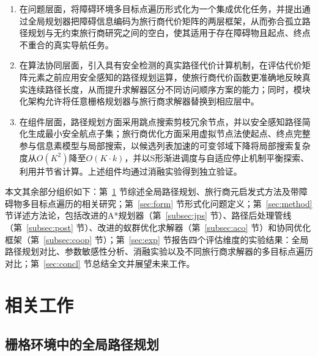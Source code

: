\documentclass[lettersize,journal]{IEEEtran}
\begin{document}
\begin{enumerate}

\item 在问题层面，将障碍环境多目标点遍历形式化为一个集成优化任务，并提出通过全局规划器把障碍信息编码为旅行商代价矩阵的两层框架，从而弥合孤立路径规划与无约束旅行商研究之间的空白，使其适用于存在障碍物且起点、终点不重合的真实导航任务。

\item 在算法协同层面，引入具有安全检测的真实路径代价计算机制，在评估代价矩阵元素之前应用安全感知的路径规划运算，使旅行商代价函数更准确地反映真实连续路径长度，从而提升求解器区分不同访问顺序方案的能力；同时，模块化架构允许将任意栅格规划器与旅行商求解器替换到相应层中。

\item 在组件层面，路径规划方面采用跳点搜索剪枝冗余节点，并以安全感知路径简化生成最小安全航点子集；旅行商优化方面采用虚拟节点法使起点、终点完整参与信息素模型与局部搜索，以候选列表加速的可变邻域下降将局部搜索复杂度从$O(K^2)$降至$O(K \cdot k)$，并以S形渐进调度与自适应停止机制平衡探索、利用并节省计算。上述组件均通过消融实验得到独立验证。

\end{enumerate}

本文其余部分组织如下：第~\ref{sec:related} 节综述全局路径规划、旅行商元启发式方法及带障碍物多目标点遍历的相关研究；第~\ref{sec:form} 节形式化问题定义；第~\ref{sec:method} 节详述方法论，包括改进的A*规划器（第~\ref{subsec:jps} 节）、路径后处理管线（第~\ref{subsec:post} 节）、改进的蚁群优化求解器（第~\ref{subsec:aco} 节）和协同优化框架（第~\ref{subsec:coop} 节）；第~\ref{sec:exp} 节报告四个评估维度的实验结果：全局路径规划对比、参数敏感性分析、消融实验以及不同旅行商求解器的多目标点遍历对比；第~\ref{sec:concl} 节总结全文并展望未来工作。

\section{相关工作}

\label{sec:related}

\subsection{栅格环境中的全局路径规划}
\end{document}
